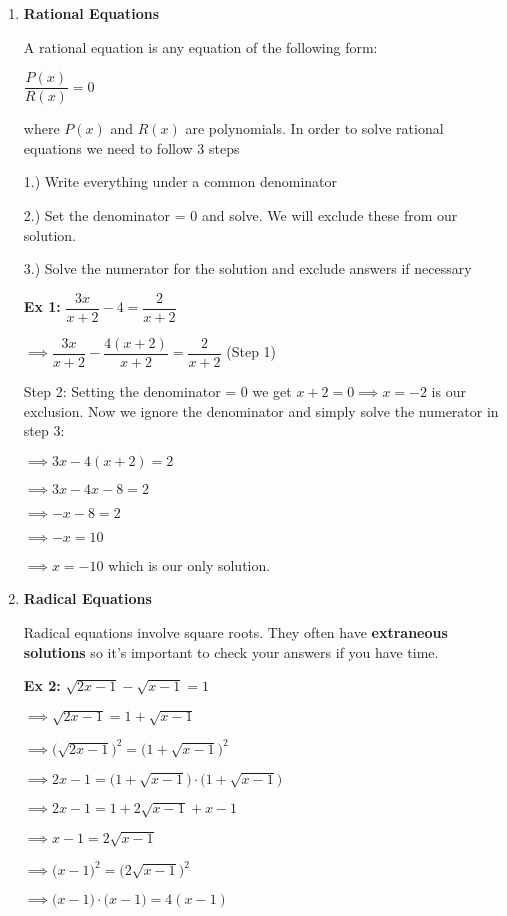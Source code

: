 \documentclass[12pt]{article}
\begin{document}
\begin{enumerate}
\item \textbf{Rational Equations}

A rational equation is any equation of the following form:
\newline

\centerline{$\dfrac{P(x)}{R(x)} = 0$}

where $P(x)$ and $R(x)$ are polynomials. In order to solve rational equations we need to follow 3 steps

1.) Write everything under a common denominator

2.) Set the denominator = 0 and solve. We will exclude these from our solution.

3.) Solve the numerator for the solution and exclude answers if necessary

\textbf{Ex 1:} $\dfrac{3x}{x+2} - 4 = \dfrac{2}{x+2}$

$\implies \dfrac{3x}{x+2} - \dfrac{4(x+2)}{x+2} = \dfrac{2}{x+2}$ (Step 1)

Step 2: Setting the denominator  = 0 we get $x+2 = 0 \implies x = -2$ is our exclusion.  Now we ignore the denominator and simply solve the numerator in step 3:

$\implies 3x - 4(x+2) = 2$

$\implies 3x - 4x -8 = 2$

$\implies - x - 8 = 2$

$\implies - x  = 10$

$\implies x = -10$ which is our only solution.


\item \textbf{Radical Equations}

Radical equations involve square roots. They often have \textbf{extraneous solutions} so it's important to check your answers if you have time. 

\textbf{Ex 2:} $\sqrt{2x-1} - \sqrt{x-1} = 1$

$\implies \sqrt{2x-1} = 1 + \sqrt{x-1} $

$\implies \Big(\sqrt{2x-1}\Big)^{2} = \Big(1 + \sqrt{x-1}\Big)^{2} $

$\implies 2x-1 = \Big(1 + \sqrt{x-1}\Big) \cdot  \Big(1 + \sqrt{x-1}\Big) $

$\implies 2x-1 = 1 + 2\sqrt{x-1} + x-1 $

$\implies x-1 = 2\sqrt{x-1}$

$\implies \Big(x-1\Big)^{2} = \Big(2\sqrt{x-1}\Big)^{2}$

$\implies \Big(x-1\Big)\cdot  \Big(x-1\Big)  = 4(x-1)$


\end{enumerate}
\end{document}
